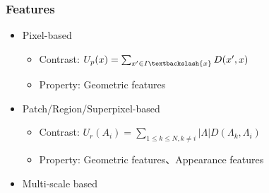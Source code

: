 \documentclass[notheorems,serif,table,compress]{beamer}  %
\begin{document}




\begin{frame}
\frametitle{Features}
\begin{itemize}
\item Pixel-based
\begin{itemize}
\item Contrast: $U_p(x) = \sum_{x'\in I\textbackslash \{ x\}}D(x', x)$
\item Property: Geometric features
\end{itemize}
\item Patch/Region/Superpixel-based
\begin{itemize}
\item Contrast: $U_r(A_i) = \sum_{1\le k \le N, k \ne i}|\Lambda|D(\Lambda_k, \Lambda_i)$
\item Property: Geometric features、Appearance features
\end{itemize}
\item Multi-scale based
\end{itemize}
\end{frame}
\end{document}

